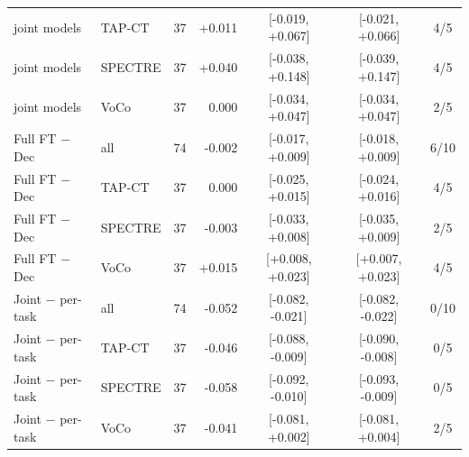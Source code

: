 \begin{tabular}{llrrccc}
\quad joint models & TAP-CT & 37 & +0.011 & [-0.019, +0.067] & [-0.021, +0.066] & 4/5 \\
\quad joint models & SPECTRE & 37 & +0.040 & [-0.038, +0.148] & [-0.039, +0.147] & 4/5 \\
\quad joint models & VoCo & 37 & 0.000 & [-0.034, +0.047] & [-0.034, +0.047] & 2/5 \\
\addlinespace[2pt]
Full FT $-$ Dec & all & 74 & -0.002 & [-0.017, +0.009] & [-0.018, +0.009] & 6/10 \\
Full FT $-$ Dec & TAP-CT & 37 & 0.000 & [-0.025, +0.015] & [-0.024, +0.016] & 4/5 \\
Full FT $-$ Dec & SPECTRE & 37 & -0.003 & [-0.033, +0.008] & [-0.035, +0.009] & 2/5 \\
Full FT $-$ Dec & VoCo & 37 & +0.015 & [+0.008, +0.023] & [+0.007, +0.023] & 4/5 \\
\addlinespace[2pt]
Joint $-$ per-task & all & 74 & -0.052 & [-0.082, -0.021] & [-0.082, -0.022] & 0/10 \\
Joint $-$ per-task & TAP-CT & 37 & -0.046 & [-0.088, -0.009] & [-0.090, -0.008] & 0/5 \\
Joint $-$ per-task & SPECTRE & 37 & -0.058 & [-0.092, -0.010] & [-0.093, -0.009] & 0/5 \\
Joint $-$ per-task & VoCo & 37 & -0.041 & [-0.081, +0.002] & [-0.081, +0.004] & 2/5 \\
\bottomrule
\end{tabular}
